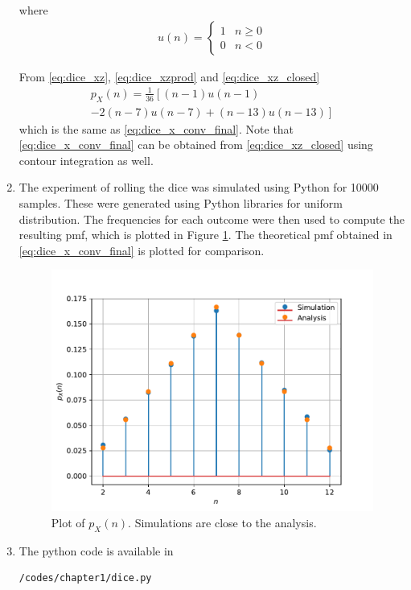 \documentclass[journal,10pt,twocolumn]{IEEEtran}
\providecommand{\lsbrak}[1]{\ensuremath{{}\left[#1\right.}}
\providecommand{\rsbrak}[1]{\ensuremath{{}\left.#1\right]}}
\providecommand{\brak}[1]{\ensuremath{\left(#1\right)}}
\begin{document}
\begin{enumerate}
where 
\begin{align}
u(n) =
\begin{cases}
1 & n \ge 0
\\
0 & n < 0
\end{cases}
\end{align}

From \eqref{eq:dice_xz}, \eqref{eq:dice_xzprod} and \eqref{eq:dice_xz_closed}
\begin{multline}
p_{X}(n) = \frac{1}{36}\lsbrak{\brak{n-1}u(n-1) 
}
\\
\rsbrak{- 2 \brak{n-7}u(n-7)+\brak{n-13}u(n-13)}
\end{multline}
which is the same as \eqref{eq:dice_x_conv_final}.  Note that  \eqref{eq:dice_x_conv_final} can be obtained from \eqref{eq:dice_xz_closed} using contour integration as well.

\item 
The experiment of rolling the dice was simulated using Python for 10000 samples.  These were generated using Python libraries for uniform distribution. The frequencies for each outcome were then used to compute the resulting pmf, which  is plotted in Figure \ref{fig:dice}.  The theoretical pmf obtained in \eqref{eq:dice_x_conv_final} is plotted for comparison.  
%
\begin{figure}[H]
\centering
\includegraphics[width=\columnwidth]{./figs/chapter1/pmf.pdf}
\caption{Plot of $p_X(n)$.  Simulations are close to the analysis. }
\label{fig:dice}
\end{figure}
\item The python code is available in 
\begin{lstlisting}
/codes/chapter1/dice.py
\end{lstlisting}

\end{enumerate}
\end{document}
